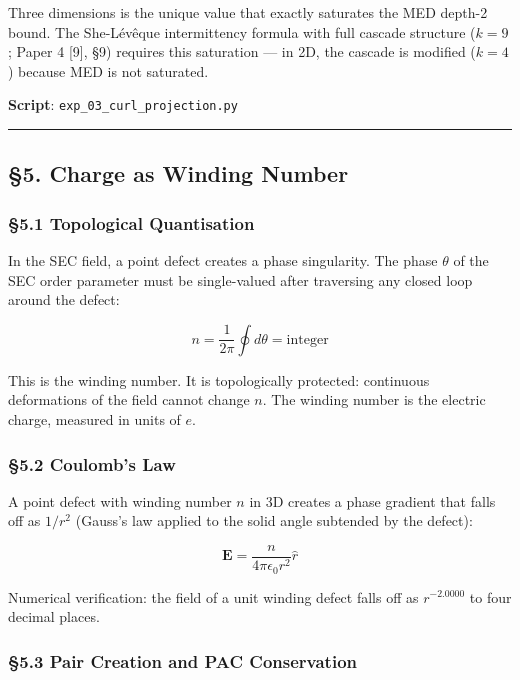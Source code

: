 \documentclass[
  11pt,
  a4paper]{article}
\begin{document}
Three dimensions is the unique value that exactly saturates the MED
depth-2 bound. The She-Lévêque intermittency formula with full cascade
structure (\(k = 9\); Paper 4 {[}9{]}, §9) requires this saturation ---
in 2D, the cascade is modified (\(k = 4\)) because MED is not saturated.

\textbf{Script}: \texttt{exp\_03\_curl\_projection.py}

\begin{center}\rule{0.5\linewidth}{0.5pt}\end{center}

\subsection{§5. Charge as Winding
Number}\label{charge-as-winding-number}

\subsubsection{§5.1 Topological
Quantisation}\label{topological-quantisation}

In the SEC field, a point defect creates a phase singularity. The phase
\(\theta\) of the SEC order parameter must be single-valued after
traversing any closed loop around the defect:

\[n = \frac{1}{2\pi}\oint d\theta = \text{integer}\]

This is the winding number. It is topologically protected: continuous
deformations of the field cannot change \(n\). The winding number is the
electric charge, measured in units of \(e\).

\subsubsection{§5.2 Coulomb's Law}\label{coulombs-law}

A point defect with winding number \(n\) in 3D creates a phase gradient
that falls off as \(1/r^2\) (Gauss's law applied to the solid angle
subtended by the defect):

\[\mathbf{E} = \frac{n}{4\pi\epsilon_0 r^2}\hat{r}\]

Numerical verification: the field of a unit winding defect falls off as
\(r^{-2.0000}\) to four decimal places.

\subsubsection{§5.3 Pair Creation and PAC
Conservation}\label{pair-creation-and-pac-conservation}
\end{document}
